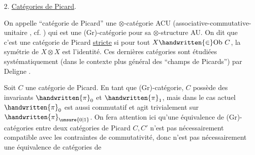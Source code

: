 2. \uline{Catégories de Picard}.

On appelle ``catégorie de Picard'' une $\otimes$-catégorie ACU (associative-commutative-unitaire , cf. \handwritten{[\, ]}) qui est une (Gr)-catégorie pour sa  $\otimes$-structure AU. On dit que c'est une catégorie de Picard \uline{stricte} si pour tout $X\handwritten{\in}\mathrm{Ob}\ C$, la symétrie de $X\otimes X$ est l'identité. Ces  dernières catégories sont étudiées systématiquement (dans le contexte plus général des ``champs de Picards'') par Deligne \handwritten{[\, ]}.

Soit $C$ une catégorie de Picard. En tant que (Gr)-catégorie, $C$ possède des invariants $\handwritten{\pi}_{0}$ et $\handwritten{\pi}_{1}$, mais dans le cas actuel $\handwritten{\pi}_{0}$ est aussi commutatif et agit trivialement sur $\handwritten{\pi}_{\unsure{0|1}}$. On fera attention ici qu'une équivalence de (Gr)-catégories entre deux catégories de Picard $C,C'$ n'est pas nécessairement compatible avec les contraintes de commutativité, donc n'est pas nécessairement une équivalence de catégories de
